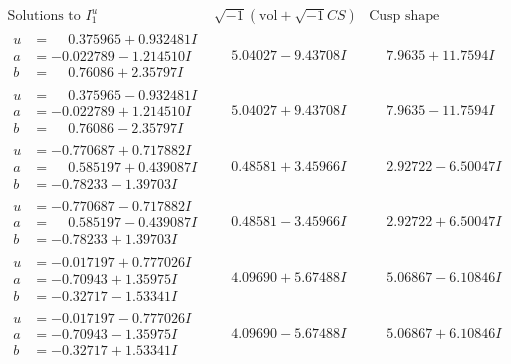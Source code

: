 \documentclass[1p]{elsarticle_modified}
\theoremstyle{definition}
\newcommand{\I}{\sqrt{-1}}
\begin{document}
$$\begin{array}{c|c|c}  
\text{Solutions to }I^u_{1}& \I (\text{vol} + \sqrt{-1}CS) & \text{Cusp shape}\\
 \hline 
\begin{aligned}
u &= \phantom{-}0.375965 + 0.932481 I \\
a &= -0.022789 - 1.214510 I \\
b &= \phantom{-}0.76086 + 2.35797 I\end{aligned}
 & \phantom{-}5.04027 - 9.43708 I & \phantom{-}7.9635 + 11.7594 I \\ \hline\begin{aligned}
u &= \phantom{-}0.375965 - 0.932481 I \\
a &= -0.022789 + 1.214510 I \\
b &= \phantom{-}0.76086 - 2.35797 I\end{aligned}
 & \phantom{-}5.04027 + 9.43708 I & \phantom{-}7.9635 - 11.7594 I \\ \hline\begin{aligned}
u &= -0.770687 + 0.717882 I \\
a &= \phantom{-}0.585197 + 0.439087 I \\
b &= -0.78233 - 1.39703 I\end{aligned}
 & \phantom{-}0.48581 + 3.45966 I & \phantom{-}2.92722 - 6.50047 I \\ \hline\begin{aligned}
u &= -0.770687 - 0.717882 I \\
a &= \phantom{-}0.585197 - 0.439087 I \\
b &= -0.78233 + 1.39703 I\end{aligned}
 & \phantom{-}0.48581 - 3.45966 I & \phantom{-}2.92722 + 6.50047 I \\ \hline\begin{aligned}
u &= -0.017197 + 0.777026 I \\
a &= -0.70943 + 1.35975 I \\
b &= -0.32717 - 1.53341 I\end{aligned}
 & \phantom{-}4.09690 + 5.67488 I & \phantom{-}5.06867 - 6.10846 I \\ \hline\begin{aligned}
u &= -0.017197 - 0.777026 I \\
a &= -0.70943 - 1.35975 I \\
b &= -0.32717 + 1.53341 I\end{aligned}
 & \phantom{-}4.09690 - 5.67488 I & \phantom{-}5.06867 + 6.10846 I \\ \hline\begin{aligned}

\end{aligned}
\end{array}$$
\end{document}
